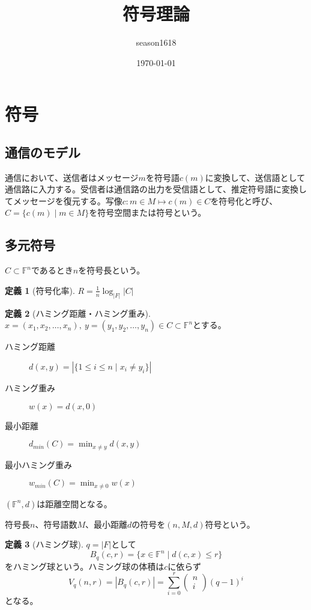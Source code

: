 \documentclass{jsarticle}
\title{符号理論}
\author{season1618}
\date{\today}
\newcommand{\F}{\mathbb{F}}
\renewcommand{\(}{\left(}
\renewcommand{\)}{\right)}
\theoremstyle{definition}
\newtheorem{dfn}{定義}
\begin{document}
\maketitle
\tableofcontents

\section{符号}

\subsection{通信のモデル}

通信において、送信者はメッセージ$m$を符号語$c(m)$に変換して、送信語として通信路に入力する。受信者は通信路の出力を受信語として、推定符号語に変換してメッセージを復元する。写像$c: m \in M \mapsto c(m) \in C$を符号化と呼び、$C = \{c(m) \mid m \in M\}$を符号空間または符号という。

\subsection{多元符号}

$C \subset \F^n$であるとき$n$を符号長という。
\begin{dfn}[符号化率]
    $R = \frac{1}{n}\log_{|F|}|C|$
\end{dfn}

\begin{dfn}[ハミング距離・ハミング重み]
    $x = (x_1, x_2, \dots, x_n),\ y = (y_1, y_2, \dots, y_n) \in C \subset \F^n$とする。
    \begin{description}
        \item[ハミング距離] $d(x, y) = |\{1 \leq i \leq n \mid x_i \neq y_i\}|$
        \item[ハミング重み] $w(x) = d(x, 0)$
        \item[最小距離] $d_{min}(C) = \min_{x \neq y} d(x, y)$
        \item[最小ハミング重み] $w_{min}(C) = \min_{x \neq 0} w(x)$
    \end{description}
    $(\F^n, d)$は距離空間となる。
\end{dfn}

符号長$n$、符号語数$M$、最小距離$d$の符号を$(n, M, d)$符号という。

\begin{dfn}[ハミング球]
    $q = |F|$として
        \[B_q(c, r) = \{x \in \F^n \mid d(c, x) \leq r\}\]
    をハミング球という。ハミング球の体積は$c$に依らず
        \[V_q(n, r) = |B_q(c, r)| = \sum_{i=0}^r \begin{pmatrix}n\\ i\end{pmatrix}(q - 1)^i\]
    となる。
\end{dfn}
\end{document}
